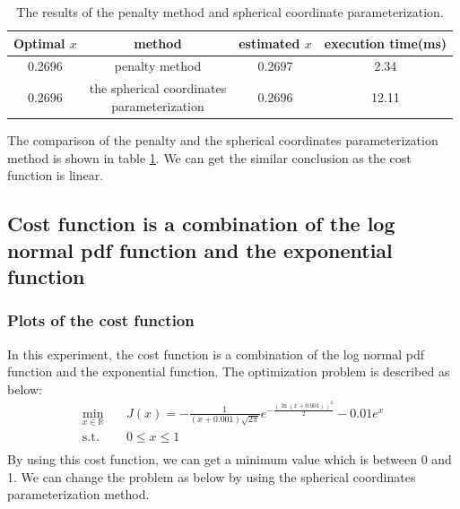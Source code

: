 \documentclass[a4paper,12pt]{article}
\begin{document}

\begin{table}[!ht]
\begin{center}
\begin{tabular}{|c|c|c|c|}
\hline
Optimal $x$& method & estimated $x$&execution time(ms)\\
\hline
0.2696& penalty method&0.2697&2.34\\
\hline
0.2696&  \makecell{ the spherical coordinates \\parameterization}&0.2696&12.11\\

\hline
\end{tabular}
\end{center}
\caption{The results of the penalty method and spherical coordinate parameterization.}
\label{tab:poly}
\end{table}


The comparison of the penalty and the spherical coordinates parameterization method is shown in table \ref{tab:poly}. We can get the similar conclusion as the cost function is linear. \\

\subsection{Cost function is a combination of the log normal pdf function and the exponential function }
\subsubsection{Plots of the cost function }
In this experiment, the cost function is  a combination of the log normal pdf function and the exponential function. The optimization problem is described as below:\\
\begin{equation}\label{eq:exp2}
\begin{aligned}
\min_{x\in \mathbb{R}} \quad &J(x) =-\frac{1}{(x+0.001) \sqrt{2 \pi}}e^{-\frac{{(\ln(x+0.001))}^2}{2} }-0.01 e^x \\
\textrm{s.t.} \quad & 0 \leq x \leq 1\\
\end{aligned}
\end{equation}
By using this cost function, we can get a minimum value which is between 0 and 1. We can change the problem as below by using the spherical coordinates parameterization method.\\
\end{document}
